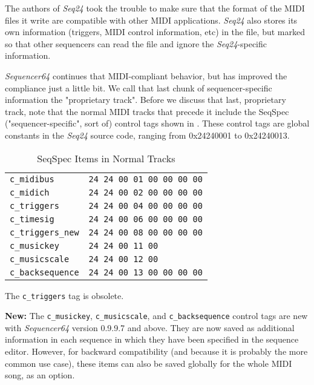    The authors of \textsl{Seq24} took the trouble to make sure that the format
   of the MIDI files it write are compatible with other MIDI applications.
   \textsl{Seq24} also stores its own information (triggers, MIDI control
   information, etc) in the file, but marked so that other sequencers can read
   the file and ignore the \textsl{Seq24}-specific information.

   \textsl{Sequencer64} continues that MIDI-compliant behavior, but has
   improved the compliance just a little bit. 
   We call that last chunk of sequencer-specific information the "proprietary
   track".
   Before we discuss that last, proprietary track, note that the normal MIDI
   tracks that
   precede it include the SeqSpec ("sequencer-specific", sort of)
   control tags shown in .
   These control tags are global constants in the \textsl{Seq24} source
   code, ranging from 0x24240001 to 0x24240013.

   \begin{table}[htb]
      \centering
      \caption{SeqSpec Items in Normal Tracks}
      \label{table:seqspec_items_normal_tracks}
      \begin{tabular}{l l}
         \texttt{c\_midibus}        & \texttt{24 24 00 01 00 00 00 00} \\
         \texttt{c\_midich}         & \texttt{24 24 00 02 00 00 00 00} \\
         \texttt{c\_triggers}       & \texttt{24 24 00 04 00 00 00 00} \\
         \texttt{c\_timesig}        & \texttt{24 24 00 06 00 00 00 00} \\
         \texttt{c\_triggers\_new}  & \texttt{24 24 00 08 00 00 00 00} \\
         \texttt{c\_musickey}       & \texttt{24 24 00 11 00} \\
         \texttt{c\_musicscale}     & \texttt{24 24 00 12 00} \\
         \texttt{c\_backsequence}   & \texttt{24 24 00 13 00 00 00 00} \\
      \end{tabular}
   \end{table}

   The \texttt{c\_triggers} tag is obsolete.

   \textbf{New:}
   The \texttt{c\_musickey},
   \texttt{c\_musicscale}, and
   \texttt{c\_backsequence}
   control tags are new with \textsl{Sequencer64} version 0.9.9.7 and above.
   They are now saved as additional information in each sequence in which they
   have been specified in the sequence editor.
   However, for backward compatibility (and because it is probably the more
   common use case), these items can also be
   saved globally for the whole MIDI song, as an option.

